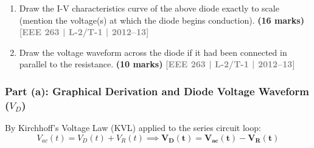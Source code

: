 \documentclass[12pt,a3paper]{article}
\newcommand{\yr}[1]{\hfill\textcolor{gray}{\small\textbf{[#1]}}}
\newcommand{\mk}[1]{\textcolor{orange!70!black}{\small\textbf{(#1 marks)}}}
\begin{document}
\begin{enumerate}
\begin{enumerate}
\begin{center}
\begin{tikzpicture}[thick,scale=0.8]
\end{tikzpicture}
\end{center}

\mk{20} \yr{EEE 263 | L-2/T-1 | 2012--13}




\item Draw the I-V characteristics curve of the above diode exactly to scale (mention the voltage(s) at which the diode begins conduction).
\mk{16} \yr{EEE 263 | L-2/T-1 | 2012--13}

\item Draw the voltage waveform across the diode if it had been connected in parallel to the resistance.
\mk{10} \yr{EEE 263 | L-2/T-1 | 2012--13}

\end{enumerate}

\begin{tcolorbox}[enhanced,breakable,ansbox,colback=cA!4,colframe=cA,boxrule=0.8pt,arc=5pt,title={\textbf{Answer}},fonttitle=\bfseries\color{white},colbacktitle=cA]

\subsubsection*{Part (a): Graphical Derivation and Diode Voltage Waveform ($V_D$)}

By Kirchhoff's Voltage Law (KVL) applied to the series circuit loop:
\begin{equation*}
    V_{ac}(t) = V_D(t) + V_R(t) \implies \mathbf{V_D(t) = V_{ac}(t) - V_R(t)}
\end{equation*}


\end{tcolorbox}
\end{enumerate}
\end{document}
